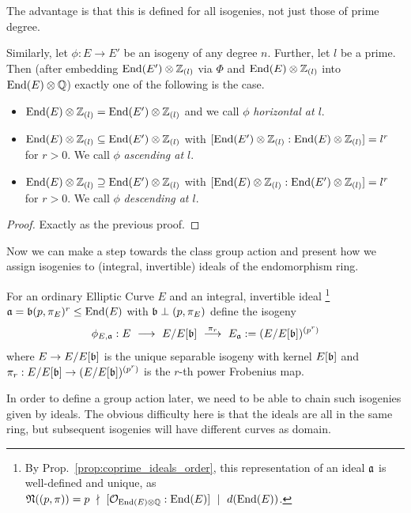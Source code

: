The advantage is that this is defined for all isogenies, not just those of prime degree.
\begin{prop}
    Similarly, let $\phi: E \to E'$ be an isogeny of any degree $n$.
    Further, let $l$ be a prime.
    Then (after embedding $\mathrm{End}(E') \otimes \mathbb{Z}_{(l)}$ via $\Phi$ and $\mathrm{End}(E) \otimes \mathbb{Z}_{(l)}$ into $\mathrm{End}(E) \otimes \mathbb{Q}$) exactly one of the following is the case.
    \begin{itemize}
        \item $\mathrm{End}(E) \otimes \mathbb{Z}_{(l)} = \mathrm{End}(E') \otimes \mathbb{Z}_{(l)}$ and we call $\phi$ \emph{horizontal at $l$}.
        \item $\mathrm{End}(E) \otimes \mathbb{Z}_{(l)} \subseteq \mathrm{End}(E') \otimes \mathbb{Z}_{(l)}$ with $[\mathrm{End}(E') \otimes \mathbb{Z}_{(l)} : \mathrm{End}(E) \otimes \mathbb{Z}_{(l)}] = l^r$ for $r > 0$. We call $\phi$ \emph{ascending at $l$}.
        \item $\mathrm{End}(E) \otimes \mathbb{Z}_{(l)} \supseteq \mathrm{End}(E') \otimes \mathbb{Z}_{(l)}$ with $[\mathrm{End}(E) \otimes \mathbb{Z}_{(l)} : \mathrm{End}(E') \otimes \mathbb{Z}_{(l)}] = l^r$ for $r > 0$. We call $\phi$ \emph{descending at $l$}.
    \end{itemize}
\end{prop}
\begin{proof}
    Exactly as the previous proof.
\end{proof}
Now we can make a step towards the class group action and present how we assign isogenies to (integral, invertible) ideals of the endomorphism ring.
\begin{definition}
    For an ordinary Elliptic Curve $E$ and an integral, invertible ideal
    \footnote{By Prop.~\ref{prop:coprime_ideals_order}, this representation of an ideal $\mathfrak{a}$ is well-defined and unique, as $\mathfrak{N}((p, \pi)) = p \ \nmid \  [\mathcal{O}_{\mathrm{End}(E) \otimes \mathbb{Q}} : \mathrm{End}(E)] \ \mid \  d(\mathrm{End}(E))$.}
    $\mathfrak{a} = \mathfrak{b}(p, \pi_E)^r \leq \mathrm{End}(E)$ with $\mathfrak{b} \perp (p, \pi_E)$ define the isogeny
    \begin{equation*}
        \phi_{E, \mathfrak{a}}: E \ \longrightarrow \ E/E[\mathfrak{b}] \ \overset{\pi_r}{\longrightarrow} \ E_{\mathfrak{a}} := (E/E[\mathfrak{b}])^{(p^r)}
    \end{equation*}
    where $E \to E/E[\mathfrak{b}]$ is the unique separable isogeny with kernel $E[\mathfrak{b}]$ and $\pi_r: E/E[\mathfrak{b}] \to (E/E[\mathfrak{b}])^{(p^r)}$ is the $r$-th power Frobenius map.
\end{definition}
In order to define a group action later, we need to be able to chain such isogenies given by ideals.
The obvious difficulty here is that the ideals are all in the same ring, but subsequent isogenies will have different curves as domain.
